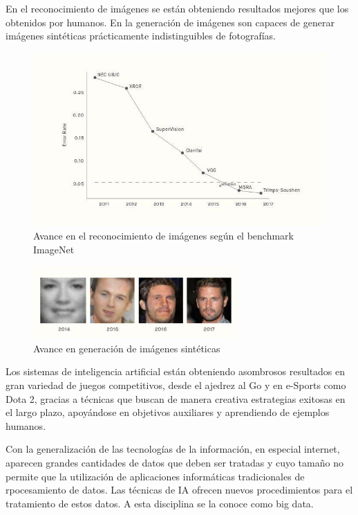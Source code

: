\documentclass[12pt,a4paper]{article}
\begin{document}
En el reconocimiento de imágenes se están obteniendo resultados mejores que los obtenidos por humanos. En la generación de imágenes son capaces de generar imágenes sintéticas prácticamente indistinguibles de fotografías.

\begin{figure}[h!]
 \centering
 \includegraphics[width=1.0\textwidth]{grafica.jpg}
 \caption{Avance en el reconocimiento de imágenes según el benchmark ImageNet}
\end{figure}

\begin{figure}[h!]
 \centering
 \includegraphics[width=0.7\textwidth]{fotos.jpg}
 \caption{Avance en generación de imágenes sintéticas}
\end{figure}

Los sistemas de inteligencia artificial están obteniendo asombrosos resultados en gran variedad de juegos competitivos, desde el ajedrez al Go y en e-Sports como Dota 2, gracias a técnicas que buscan de manera creativa estrategias exitosas en el largo plazo, apoyándose en objetivos auxiliares y aprendiendo de ejemplos humanos.

Con la generalización de las tecnologías de la información, en especial internet, aparecen grandes cantidades de datos que deben ser tratadas y cuyo tamaño no permite que la utilización de aplicaciones informáticas tradicionales de rpocesamiento de datos. Las técnicas de IA ofrecen nuevos procedimientos para el tratamiento de estos datos. A esta disciplina se la conoce como big data.
\end{document}
